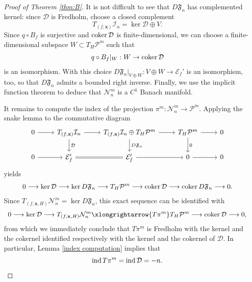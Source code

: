 \documentclass[11pt,a4paper]{article}
\theoremstyle{definition}
\newcommand{\coker}{\textnormal{coker\,}}
\DeclareMathOperator{\ind}{ind}
\newcommand{\fF}{\mathfrak{F}}
\newcommand{\cE}{\mathcal{E}}
\newcommand{\cD}{\mathcal{D}}
\newcommand{\cI}{\mathcal{I}}
\newcommand{\cP}{\mathcal{P}}
\newcommand{\cN}{\mathcal{N}}
\newcommand{\bx}{\mathbf{x}}
\begin{document}
\begin{proof}[Proof of Theorem \ref{thm:B}]
  It is not difficult to see that $D\fF_n$ has complemented kernel: since $\cD$ is Fredholm, choose a closed complement
  \begin{equation*}
    T_{(f, \bx)} \cI_n = \ker \cD \oplus V.
  \end{equation*}
  Since $q \circ B_f$ is surjective and $\coker \cD$ is finite-dimensional, we can choose a finite-dimensional subspace $W \subset T_H \cP^m$ such that
  \begin{equation*}
    q \circ B_f |_{W} : W \to \coker \cD
  \end{equation*}
  is an isomorphism. With this choice $D\fF_n|_{V \oplus W}: V \oplus W \to \cE_f'$ is an isomorphism, too, so that $D\fF_n$ admits a bounded right inverse. Finally, we use the implicit function theorem to deduce that $\cN^m_n$ is a $C^1$ Banach manifold. 

  It remains to compute the index of the projection $\pi^m: \cN^m_n \to \cP^m$. Applying the snake lemma to the commutative diagram 
  \[\begin{tikzcd}
    0 & {T_{(f, \bx)}\cI_n} & {T_{(f, \bx)}\cI_n \oplus T_{H} \cP^m} & {T_{H} \cP^m} & 0 \\
    0 & {\cE'_f} & {\cE'_f} & 0 & 0
    \arrow[from=1-1, to=1-2]
    \arrow[from=1-2, to=1-3]
    \arrow["\cD", from=1-2, to=2-2]
    \arrow[from=1-3, to=1-4]
    \arrow["{D\fF_n}", from=1-3, to=2-3]
    \arrow[from=1-4, to=1-5]
    \arrow["0", from=1-4, to=2-4]
    \arrow[from=2-1, to=2-2]
    \arrow[equals, from=2-2, to=2-3]
    \arrow[from=2-3, to=2-4]
    \arrow[from=2-4, to=2-5]
  \end{tikzcd}\]
  yields
  \begin{equation*}
    0 \longrightarrow \ker \cD \longrightarrow \ker D\fF_n \longrightarrow T_H \cP^m \longrightarrow \coker \cD \longrightarrow \coker D\fF_n \longrightarrow 0.
  \end{equation*}
  Since $T_{(f, \bx, H)} \cN^m_n  = \ker D\fF_n$, this exact sequence can be identified with 
  \begin{equation*}
    0 \longrightarrow \ker \cD \longrightarrow T_{(f, \bx, H)} \cN^m_n \xlongrightarrow{T\pi^m} T_H \cP^m \longrightarrow \coker \cD \longrightarrow 0,
  \end{equation*}
  from which we immediately conclude that $T\pi^m$ is Fredholm with the kernel and the cokernel identified respectively with the kernel and the cokernel of $\cD$. In particular, Lemma \ref{index computation} implies that
  \begin{equation*}
    \ind T\pi^m = \ind \cD = -n. \qedhere
  \end{equation*}
\end{proof}
\end{document}
